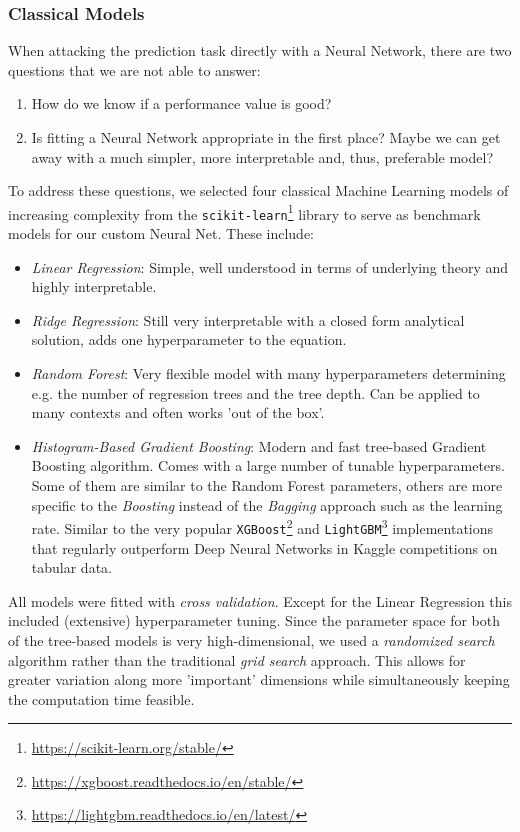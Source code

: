 \subsubsection{Classical Models} \label{classical-models}

When attacking the prediction task directly with a Neural Network, there are two questions that we are not able to answer:
\begin{enumerate}
  \item How do we know if a performance value is good?
  \item Is fitting a Neural Network appropriate in the first place?
        Maybe we can get away with a much simpler, more interpretable and, thus, preferable model?
\end{enumerate}
To address these questions, we selected four classical Machine Learning models of increasing complexity from the \texttt{scikit-learn}\footnote{\url{https://scikit-learn.org/stable/}} library \citep{pedregosa2011} to serve as benchmark models for our custom Neural Net.
These include:
\begin{itemize}
  \item \textit{Linear Regression}:
        Simple, well understood in terms of underlying theory and highly interpretable.
  \item \textit{Ridge Regression}:
        Still very interpretable with a closed form analytical solution, adds one hyperparameter to the equation.
  \item \textit{Random Forest}:
        Very flexible model with many hyperparameters determining e.g. the number of regression trees and the tree depth.
        Can be applied to many contexts and often works 'out of the box'.
  \item \textit{Histogram-Based Gradient Boosting}:
        Modern and fast tree-based Gradient Boosting algorithm.
        Comes with a large number of tunable hyperparameters.
        Some of them are similar to the Random Forest parameters, others are more specific to the \emph{Boosting} instead of the \emph{Bagging} approach such as the learning rate.
        Similar to the very popular \texttt{XGBoost}\footnote{\url{https://xgboost.readthedocs.io/en/stable/}} \citep{chen2016} and \texttt{LightGBM}\footnote{\url{https://lightgbm.readthedocs.io/en/latest/}} \citep{ke2017} implementations that regularly outperform Deep Neural Networks in Kaggle competitions on tabular data.
\end{itemize}

All models were fitted with \emph{cross validation}.
Except for the Linear Regression this included (extensive) hyperparameter tuning.
Since the parameter space for both of the tree-based models is very high-dimensional, we used a \emph{randomized search} algorithm \citep{bergstra2012} rather than the traditional \emph{grid search} approach.
This allows for greater variation along more 'important' dimensions while simultaneously keeping the computation time feasible.


